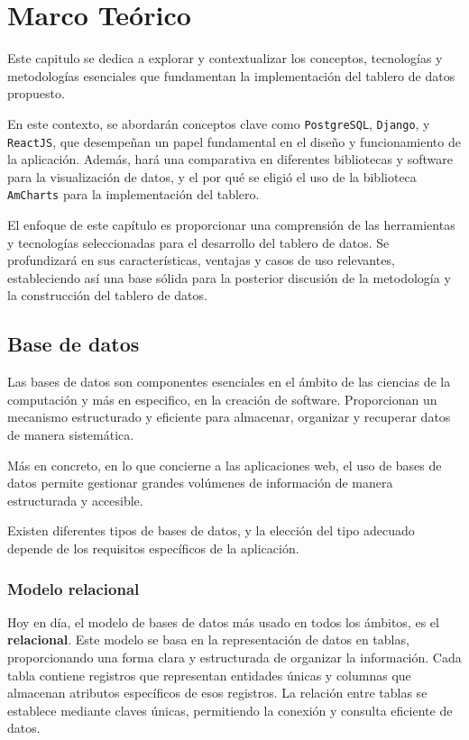 \setlength{\arrayrulewidth}{0.5mm}
\setlength{\tabcolsep}{18pt}
\renewcommand{\arraystretch}{1.5}


\chapter{Marco Teórico} \label{cap:antecedentes}




Este capitulo se dedica a explorar y contextualizar los conceptos, tecnologías y metodologías esenciales que fundamentan la implementación del tablero de datos propuesto. 

En este contexto, se abordarán conceptos clave como \texttt{PostgreSQL}, \texttt{Django}, y \texttt{ReactJS}, que desempeñan un papel fundamental en el diseño y funcionamiento de la aplicación. Además, hará una comparativa en diferentes bibliotecas y software para la visualización de datos, y el por qué se eligió el uso de la biblioteca \texttt{AmCharts} para la implementación del tablero.

El enfoque de este capítulo es proporcionar una comprensión  de las herramientas y tecnologías seleccionadas para el desarrollo del tablero de datos. Se profundizará en sus características, ventajas y casos de uso relevantes, estableciendo así una base sólida para la posterior discusión de la metodología y la construcción del tablero de datos.

\section{Base de datos}\label{sec:basedatos}
Las bases de datos son componentes esenciales en el ámbito de las ciencias de la computación y más en especifico, en la creación de software. Proporcionan un mecanismo estructurado y eficiente para almacenar, organizar y recuperar datos de manera sistemática. 

Más en concreto, en lo que concierne a las aplicaciones web, el uso de bases de datos permite gestionar grandes volúmenes de información de manera estructurada y accesible.

Existen diferentes tipos de bases de datos, y la elección del tipo adecuado depende de los requisitos específicos de la aplicación. 

\subsection{Modelo relacional}
Hoy en día, el modelo de bases de datos más usado en todos los ámbitos, es el \textbf{relacional}. Este modelo se basa en la representación de datos en tablas, proporcionando una forma clara y estructurada de organizar la información. Cada tabla contiene registros que representan entidades únicas y columnas que almacenan atributos específicos de esos registros. La relación entre tablas se establece mediante claves únicas, permitiendo la conexión y consulta eficiente de datos.

